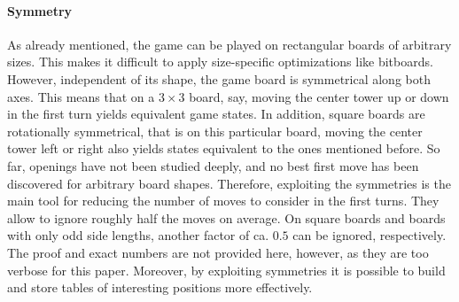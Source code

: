 \documentclass[sigconf]{acmart}
\begin{document}
\paragraph{Symmetry}
As already mentioned, the game can be played on rectangular boards of arbitrary sizes.
This makes it difficult to apply size-specific optimizations like bitboards.
However, independent of its shape, the game board is symmetrical along both axes.
This means that on a $3\times3$ board, say, moving the center tower up or down in the first turn yields equivalent game states.
In addition, square boards are rotationally symmetrical, that is on this particular board, moving the center tower left or right also yields states equivalent to the ones mentioned before.
So far, openings have not been studied deeply, and no best first move has been discovered for arbitrary board shapes.
Therefore, exploiting the symmetries is the main tool for reducing the number of moves to consider in the first turns.
They allow to ignore roughly half the moves on average.
On square boards and boards with only odd side lengths, another factor of ca. $0.5$ can be ignored, respectively.
The proof and exact numbers are not provided here, however, as they are too verbose for this paper.
Moreover, by exploiting symmetries it is possible to build and store tables of interesting positions more effectively.
\end{document}
